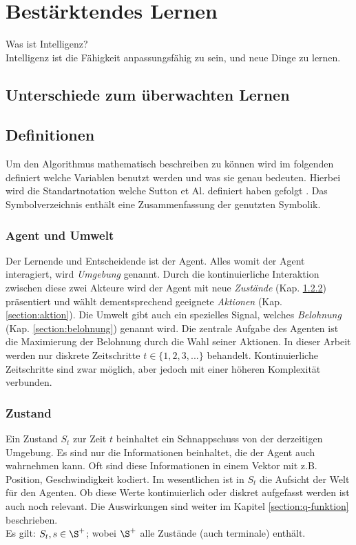 \documentclass[a4paper,titlepage]{article}
\numberwithin{equation}{section} %
\begin{document}
\section{Bestärktendes Lernen}
Was ist Intelligenz? \\
Intelligenz ist die Fähigkeit anpassungsfähig zu sein, und neue Dinge zu lernen.


\subsection{Unterschiede zum überwachten Lernen}

\subsection{Definitionen}
Um den Algorithmus mathematisch beschreiben zu können wird im folgenden definiert welche Variablen benutzt werden und
was sie genau bedeuten. Hierbei wird die Standartnotation welche Sutton et Al. definiert haben gefolgt \cite{suttonReinforcementLearningIntroduction2018}.
Das Symbolverzeichnis enthält eine Zusammenfassung der genutzten Symbolik.

\subsubsection{Agent und Umwelt}
Der Lernende und Entscheidende ist der Agent. Alles womit der Agent interagiert, wird \emph{Umgebung} genannt. Durch die kontinuierliche Interaktion zwischen diese zwei Akteure wird der Agent mit neue \emph{Zustände} (Kap. \ref{section:zustand}) präsentiert und wählt dementsprechend geeignete \emph{Aktionen} (Kap. \ref{section:aktion}). Die Umwelt gibt auch ein spezielles Signal, welches \emph{Belohnung} (Kap. \ref{section:belohnung}) genannt wird. Die zentrale Aufgabe des Agenten ist die Maximierung der Belohnung durch die Wahl seiner Aktionen. In dieser Arbeit werden nur diskrete Zeitschritte $t \in \{1, 2, 3, ...\}$ behandelt. Kontinuierliche Zeitschritte sind zwar möglich, aber jedoch mit einer höheren Komplexität verbunden.

\subsubsection{Zustand} \label{section:zustand}
Ein Zustand $S_{t}$ zur Zeit $t$ beinhaltet ein Schnappschuss von der derzeitigen Umgebung. Es sind nur die Informationen beinhaltet, die der Agent auch wahrnehmen kann. Oft sind diese Informationen in einem Vektor mit z.B. Position, Geschwindigkeit kodiert. Im wesentlichen ist in $S_{t}$ die Aufsicht der Welt für den Agenten. Ob diese Werte kontinuierlich oder diskret aufgefasst werden ist auch noch relevant. Die Auswirkungen sind weiter im Kapitel \ref{section:q-funktion} beschrieben. \\
Es gilt: $S_{t}, s \in \S^{+}$; wobei $\S^{+}$ alle Zustände (auch terminale) enthält.
\end{document}
